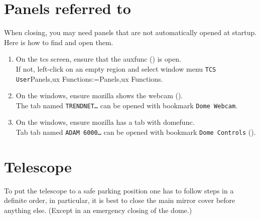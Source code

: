 \documentclass[11pt,fleqn,a4paper]{book}
\makeatletter
\def\menu#1#2{\texttt{#1}\ifx{}#2\else\@for\@x:=#2\do{$\rightarrow$\texttt{\@x}}\fi}
\def\wmenu#1#2{window menu \menu{#1}{#2}}
\makeatother
\begin{document}
\section{Panels referred to}
When closing, you may need panels that are not automatically opened at startup. Here is how to find and open them.
\begin{enumerate}
\item On the \gls{tcs} screen, ensure that the \gls{auxfunc} () is open.\\
      If not, left-click on an empty region and select \wmenu{TCS User}{Panels,ux Functions}.
\item On the \gls{windows}, ensure mozilla shows the \gls{webcam} ().\\
      The tab named \texttt{TRENDNET…} can be opened with bookmark \texttt{Dome Webcam}.
\item On the \gls{windows}, ensure mozilla has a tab with \gls{domefunc}.\\
      Tab tab named \texttt{ADAM 6000…} can be opened with bookmark \texttt{Dome Controls} ().
\end{enumerate}

\section{Telescope}

To put the telescope to a safe parking position one has to follow steps in a definite order, in particular, it is best to close the \gls{main mirror} cover before anything else. (Except in an emergency closing of the dome.) 
\end{document}
